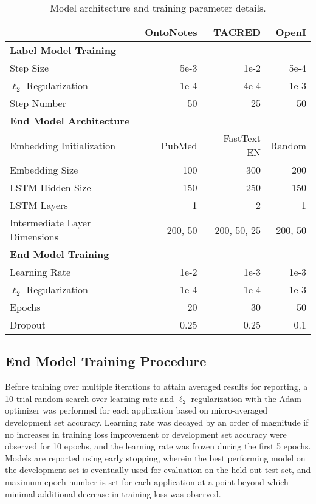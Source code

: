 \documentclass[letterpaper]{article}
\begin{document}
\begin{appendix}
\begin{table}[h!]
    \begin{center}
    \begin{tabular}{lrrr} 
        \toprule
        & OntoNotes & TACRED  & OpenI  \\ \midrule \midrule
        \textbf{Label Model Training} & & \\ \midrule
        Step Size & 5e-3 & 1e-2 & 5e-4 \\
        $\ell_2$  Regularization& 1e-4 &  4e-4 & 1e-3 \\
        Step Number &  50 & 25 & 50\\
        \midrule
        \textbf{End Model Architecture} & & \\ \midrule
        Embedding Initialization & PubMed & FastText EN & Random \\
        Embedding Size & 100 & 300 & 200\\
        LSTM Hidden Size & 150 & 250 & 150 \\
        LSTM Layers & 1 & 2 & 1 \\
        Intermediate Layer Dimensions & 200, 50 & 200, 50, 25  & 200, 50\\ \midrule
        \textbf{End Model Training} & & \\ \midrule
        Learning Rate & 1e-2 & 1e-3 & 1e-3 \\
        $\ell_2$ Regularization & 1e-4 & 1e-4  & 1e-3 \\
        Epochs & 20 & 30 & 50 \\
        Dropout & 0.25 & 0.25 & 0.1 \\ 
        \bottomrule
    \end{tabular}
    \caption{Model architecture and training parameter details.}
    \label{table:hyperparameters}
    \end{center}
    \end{table}

\subsection{End Model Training Procedure}
Before training over multiple iterations to attain averaged results for reporting, a 10-trial random search over learning rate and $\ell_2$ regularization with the Adam optimizer was performed for each application based on micro-averaged development set accuracy.  Learning rate was decayed by an order of magnitude if no increases in training loss improvement or development set accuracy were observed for 10 epochs, and the learning rate was frozen during the first 5 epochs.  Models are reported using early stopping, wherein the best performing model on the development set is eventually used for evaluation on the held-out test set, and maximum epoch number is set for each application at a point beyond which minimal additional decrease in training loss was observed.


\end{appendix}
\end{document}
